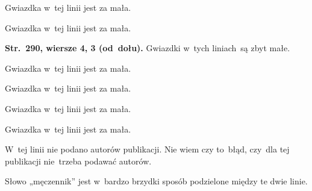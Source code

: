 \documentclass[a4paper,11pt]{article}
\begin{document}
\vspace{\spaceFour}





\noindent
{} Gwiazdka w~tej linii jest za mała.

\vspace{\spaceFour}





\noindent
{} Gwiazdka w~tej linii jest za mała.

\vspace{\spaceFour}





\noindent
\textbf{Str.~290, wiersze 4, 3 (od~dołu).} Gwiazdki w~tych liniach~są zbyt
małe.

\vspace{\spaceFour}





\noindent
{} Gwiazdka w~tej linii jest za mała.

\vspace{\spaceFour}





\noindent
{} Gwiazdka w~tej linii jest za mała.

\vspace{\spaceFour}





\noindent
{} Gwiazdka w~tej linii jest za mała.

\vspace{\spaceFour}





\noindent
{} Gwiazdka w~tej linii jest za mała.

\vspace{\spaceFour}



\noindent
{} W~tej linii nie podano autorów publikacji. Nie
wiem czy to~błąd, czy~dla tej publikacji nie~trzeba podawać autorów.

\vspace{\spaceFour}





\noindent
{} Słowo „męczennik” jest w~bardzo brzydki
sposób podzielone między te dwie linie.
\end{document}
